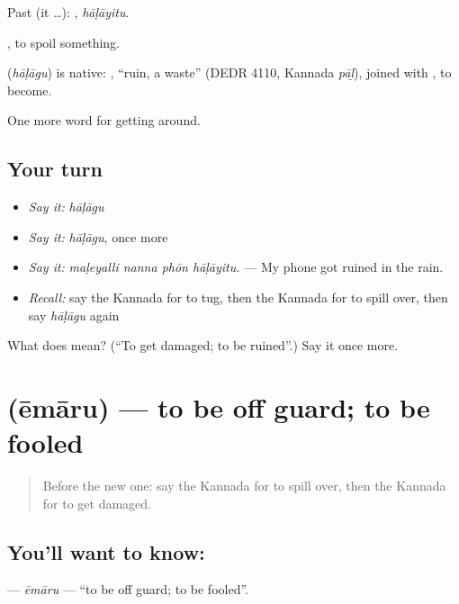 Past (it …): , \emph{hāḷāyitu}.

 , to spoil something.

\begin{cousinweb}
\textbf{} (\emph{hāḷāgu}) is native: , \textquotedblleft{}ruin, a waste\textquotedblright{} (DEDR 4110, Kannada \emph{pāḻ}), joined with , to become.
\end{cousinweb}

\begin{grammarlens}[title={What you've built}]
One more word for getting around.
\end{grammarlens}

\subsection*{Your turn}
\begin{itemize}
\raggedright
  \item \emph{Say it:} \emph{hāḷāgu}
  \item \emph{Say it:} \emph{hāḷāgu}, once more
  \item \emph{Say it:} \emph{maḷeyalli nanna phōn hāḷāyitu.} — My phone got ruined in the rain.
  \item \emph{Recall:} say the Kannada for to tug, then the Kannada for to spill over, then say \emph{hāḷāgu} again
\end{itemize}

\begin{tcolorbox}[breakable,colback=teal!4,colframe=teal!35!black,title={Before you move on}]
What does  mean? (\textquotedblleft{}To get damaged; to be ruined\textquotedblright{}.) Say it once more.
\end{tcolorbox}
\section[\texorpdfstring{\kn{ಏಮಾರು} (ēmāru)}{ಏಮಾರು (ēmāru)}]{ (ēmāru) — to be off guard; to be fooled}

\label{lesson:KA-C472-emaru}



\begin{quote}
Before the new one: say the Kannada for to spill over, then the Kannada for to get damaged.
\end{quote}

\subsection*{You'll want to know: }
\textbf{} — \emph{ēmāru} — \textquotedblleft{}to be off guard; to be fooled\textquotedblright{}.

